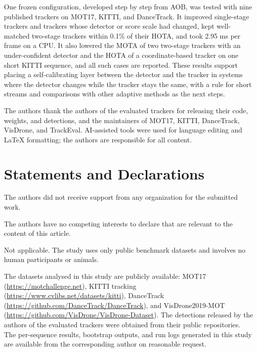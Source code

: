 \documentclass[pdflatex,sn-mathphys-num]{sn-jnl}
\newcommand{\aob}{AOB}
\begin{document}
One frozen configuration, developed step by step from \aob{}, was tested with
nine published trackers on MOT17, KITTI, and DanceTrack. It improved
single-stage trackers and trackers whose detector or score scale had changed,
kept well-matched two-stage trackers within 0.1\% of their HOTA, and took 2.95
ms per frame on a CPU. It also lowered the MOTA of two two-stage trackers with
an under-confident detector and the HOTA of a coordinate-based tracker on one
short KITTI sequence, and all such cases are reported. These results support
placing a self-calibrating layer between the detector and the tracker in
systems where the detector changes while the tracker stays the same, with a
rule for short streams and comparisons with other adaptive methods as the next
steps.

\backmatter

The authors thank the authors of the evaluated trackers for releasing their code, weights, and
detections, and the maintainers of MOT17, KITTI, DanceTrack, VisDrone, and TrackEval.
AI-assisted tools were used for language editing and LaTeX formatting; the authors are
responsible for all content.

\section*{Statements and Declarations}

The authors did not receive support from any organization for the submitted work.

The authors have no competing interests to declare that are relevant to the content of this
article.

Not applicable. The study uses only public benchmark datasets and involves no human participants
or animals.

The datasets analysed in this study are publicly available: MOT17
(\url{https://motchallenge.net}), KITTI tracking (\url{https://www.cvlibs.net/datasets/kitti}),
DanceTrack (\url{https://github.com/DanceTrack/DanceTrack}), and VisDrone2019-MOT
(\url{https://github.com/VisDrone/VisDrone-Dataset}). The detections released by the authors of the
evaluated trackers were obtained from their public repositories. The per-sequence results,
bootstrap outputs, and run logs generated in this study are available from the corresponding author
on reasonable request.
\end{document}
